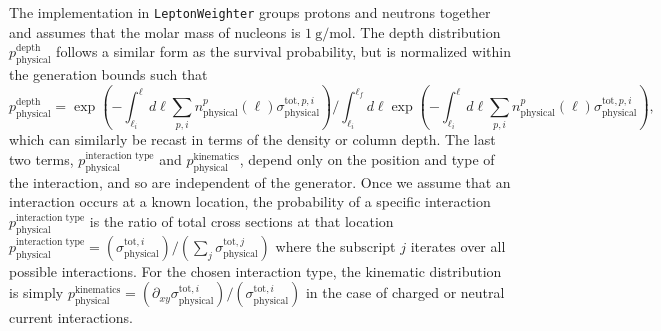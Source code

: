 \documentclass[main.tex]{subfiles}
\newcommand{\LeptonWeighter}{\texttt{LeptonWeighter}}
\begin{document}
The implementation in \LeptonWeighter{} groups protons and neutrons together and assumes that the molar mass of nucleons is $\SI{1}{\gram\per\mol}$.
The depth distribution $p_\textrm{physical}^\textrm{depth}$ follows a similar form as the survival probability, but is normalized within the generation bounds such that
\begin{equation}
p_\textrm{physical}^\textrm{depth} = \exp\left(-{\int_{\ell_i}^{\ell}{d\ell \sum_{p,i} n_\textrm{physical}^p(\ell) \sigma_\textrm{physical}^{\textrm{tot},p,i} }}\right) / \int_{\ell_i}^{\ell_f}{d\ell}\exp\left(-{\int_{\ell_i}^{\ell}{d\ell \sum_{p,i} n_\textrm{physical}^p(\ell) \sigma_\textrm{physical}^{\textrm{tot},p,i} }}\right),
\end{equation}
which can similarly be recast in terms of the density or column depth.
The last two terms, $p_\textrm{physical}^\textrm{interaction type}$ and $p_\textrm{physical}^\textrm{kinematics}$, depend only on the position and type of the interaction, and so are independent of the generator.
Once we assume that an interaction occurs at a known location, the probability of a specific interaction $p_\textrm{physical}^\textrm{interaction type}$ is the ratio of total cross sections at that location $p_\textrm{physical}^\textrm{interaction type} = (\sigma_\textrm{physical}^{\textrm{tot}, i})/(\sum_j \sigma_\textrm{physical}^{\textrm{tot}, j})$ where the subscript $j$ iterates over all possible interactions.
For the chosen interaction type, the kinematic distribution is simply $p_\textrm{physical}^\textrm{kinematics} = (\partial_{xy}\sigma_\textrm{physical}^{\textrm{tot}, i}) / (\sigma_\textrm{physical}^{\textrm{tot}, i})$ in the case of charged or neutral current interactions.
\end{document}
